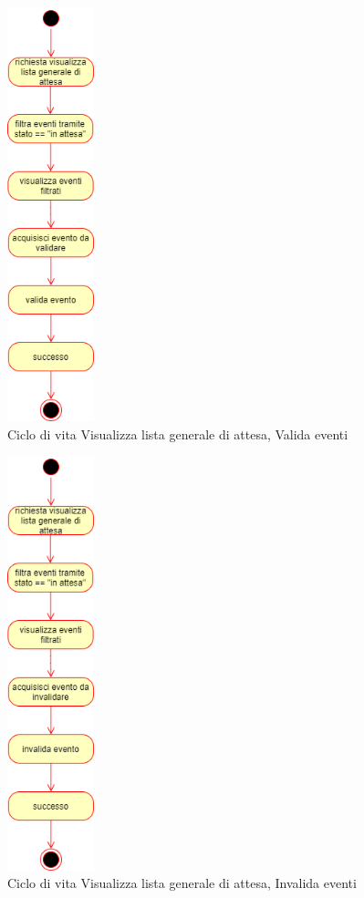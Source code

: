 \documentclass[11pt]{article}
\begin{document}
\begin{figure}[H]
\centering
\includegraphics[width=0.225\textwidth]{Ciclo di vita Visualizza lista generale di attesa, Valida eventi.png}
\caption{Ciclo di vita Visualizza lista generale di attesa, Valida eventi}
\end{figure}

\begin{figure}[H]
\centering
\includegraphics[width=0.225\textwidth]{Ciclo di vita Visualizza lista generale di attesa, Invalida eventi.png}
\caption{Ciclo di vita Visualizza lista generale di attesa, Invalida eventi}
\end{figure}
\end{document}
